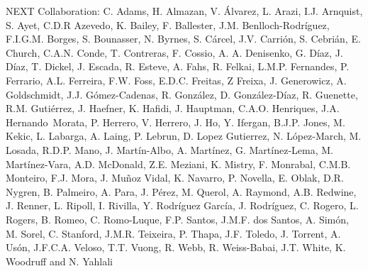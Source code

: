 NEXT Collaboration: C. Adams, H. Almazan, V. \'Alvarez, L. Arazi, I.J. Arnquist, S. Ayet, C.D.R Azevedo, K. Bailey, F. Ballester, J.M. Benlloch-Rodr\'{i}guez, F.I.G.M. Borges, S. Bounasser, N. Byrnes, S. C\'arcel, J.V. Carri\'on, S. Cebri\'an, E. Church, C.A.N. Conde, T. Contreras, F. Cossio, A. A. Denisenko, G. D\'iaz, J. D\'iaz, T. Dickel, J. Escada, R. Esteve, A. Fahs, R. Felkai, L.M.P. Fernandes, P. Ferrario, A.L. Ferreira, F.W. Foss, E.D.C. Freitas, Z Freixa, J. Generowicz, A. Goldschmidt, J.J. G\'omez-Cadenas, R. Gonz\'alez, D. Gonz\'alez-D\'iaz, R. Guenette, R.M. Guti\'errez, J. Haefner, K. Hafidi, J. Hauptman, C.A.O. Henriques, J.A. Hernando~Morata, P. Herrero, V. Herrero, J. Ho, Y. Ifergan, B.J.P. Jones, M. Kekic, L. Labarga, A. Laing, P. Lebrun, D. Lopez Gutierrez, N. L\'opez-March, M. Losada, R.D.P. Mano, J. Mart\'in-Albo, A. Mart\'inez, G. Mart\'inez-Lema, M. Mart\'inez-Vara, A.D. McDonald, Z.E. Meziani, K. Mistry, F. Monrabal, C.M.B. Monteiro, F.J. Mora, J. Mu\~noz Vidal, K. Navarro, P. Novella, E. Oblak, D.R. Nygren, B. Palmeiro, A. Para, J. P\'erez, M. Querol, A. Raymond, A.B. Redwine, J. Renner, L. Ripoll, I. Rivilla, Y. Rodr\'iguez Garc\'ia, J. Rodr\'iguez, C. Rogero, L. Rogers, B. Romeo, C. Romo-Luque, F.P. Santos, J.M.F. dos Santos, A. Sim\'on, M. Sorel, C. Stanford, J.M.R. Teixeira, P. Thapa, J.F. Toledo, J. Torrent, A. Us\'on, J.F.C.A. Veloso, T.T. Vuong, R. Webb, R. Weiss-Babai, J.T. White, K. Woodruff and N. Yahlali